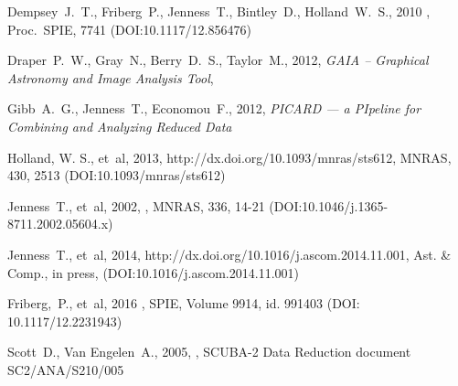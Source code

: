 \documentclass[11pt,oneside,chapters]{starlink}
\begin{document}
\begin{thebibliography}{}
Dempsey~J.~T., Friberg~P., Jenness~T., Bintley~D., Holland~W.~S., 2010
,
Proc.\ SPIE, 7741 (DOI:10.1117/12.856476)

Draper~P.~W., Gray~N., Berry~D.~S., Taylor~M., 2012,
\textit{GAIA -- Graphical Astronomy and Image Analysis Tool},

Gibb~A.~G., Jenness~T., Economou~F., 2012, \textit{PICARD --- a
PIpeline for Combining and Analyzing Reduced Data}

Holland, W. S., et~al, 2013, 
{http://dx.doi.org/10.1093/mnras/sts612}, MNRAS, 430, 2513
(DOI:10.1093/mnras/sts612)

Jenness~T., et~al, 2002, ,
MNRAS, 336, 14-21 (DOI:10.1046/j.1365-8711.2002.05604.x)

Jenness~T., et~al, 2014,
 {http://dx.doi.org/10.1016/j.ascom.2014.11.001},
Ast. \& Comp., in press, (DOI:10.1016/j.ascom.2014.11.001)

Friberg,~P., et~al, 2016 ,
SPIE, Volume 9914, id. 991403
(DOI: 10.1117/12.2231943)

Scott~D., Van Engelen~A., 2005, ,
SCUBA-2 Data Reduction document SC2/ANA/S210/005

\end{thebibliography}

\newpage
\appendix

\end{document}
